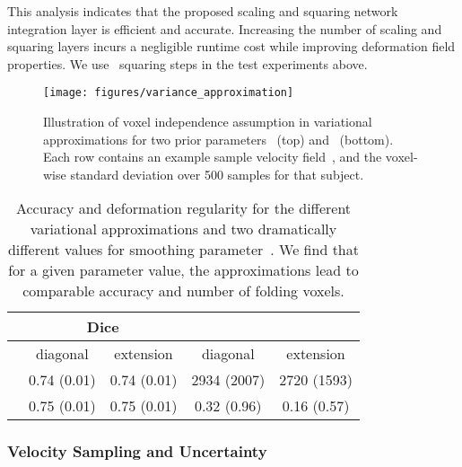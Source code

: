 \documentclass{article}
\begin{document}
	This analysis indicates that the proposed scaling and squaring network integration layer is efficient and accurate. Increasing the number of scaling and squaring layers incurs a negligible runtime cost while improving deformation field properties. We use~ squaring steps in the test experiments above.
	







\begin{figure}[t!]
\texttt{[image: figures/variance\_approximation]}
\caption{Illustration of voxel independence assumption in variational approximations for two prior parameters~ (top) and~ (bottom). Each row contains an example sample velocity field~, and the voxel-wise standard deviation over 500 samples for that subject.}
	\label{fig:smooth_approximation}
\end{figure}











\begin{table}[!t]
		\vspace{-0.1cm}
		\small
	\begin{tabular}{c | c  c | c c}
		& \multicolumn{2}{c|}{Dice}   & \multicolumn{2}{c}{} \\
		\hline
		 & diagonal  & extension & diagonal  & extension \\
		\hline
		 & 0.74 (0.01) & 0.74 (0.01) & 2934 (2007) & 2720 (1593) \\
		 & 0.75 (0.01) & 0.75 (0.01) & 0.32 (0.96) & 0.16 (0.57) \\
		\hline
	\end{tabular}
\vspace{0.1cm}
	\caption{Accuracy and deformation regularity for the different variational approximations and two dramatically different values for smoothing parameter~. We find that for a given parameter value, the approximations lead to comparable accuracy and number of folding voxels.}
	\label{tab:smooth_approximation}
\end{table}


\vfill


\subsubsection{Velocity Sampling and Uncertainty}
\end{document}
